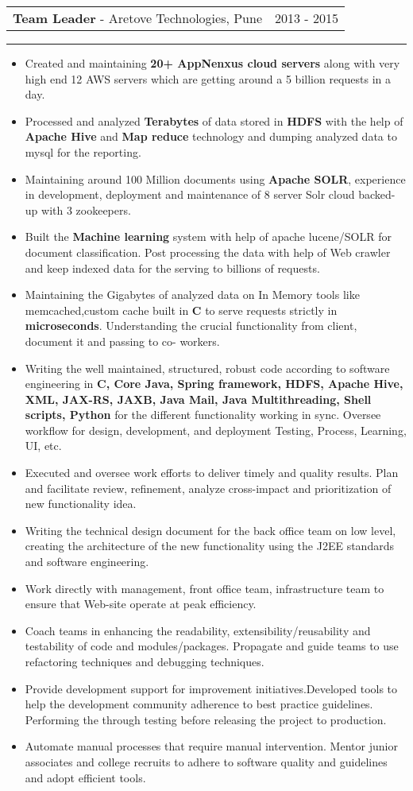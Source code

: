 \documentclass[10pt,A4]{article}
\newcommand{\cvevent}[4]
{

\begin{tabular*}{1\textwidth}{p{13.6cm}  x{3.9cm}}
	\textbf{#2} - \textcolor{bgcol}{#3} &   \vspace{2.0pt}\textcolor{sectcol}{#1}
\end{tabular*}

\vspace{-8pt}
\textcolor{softcol}{\hrule}
\vspace{6pt}

  #4 

}
\begin{document}
\cvevent{2013 - 2015}
{Team Leader}
{Aretove Technologies, Pune}
{
\begin{itemize}

\item Created and maintaining \textbf{20+ AppNenxus cloud servers} along with very high end 12 AWS servers which are getting around a 5 billion requests in a day.

\item Processed and analyzed \textbf{Terabytes} of data stored in \textbf{HDFS} with the help of \textbf{Apache Hive} and \textbf{Map reduce} 
technology and dumping analyzed data to mysql for the reporting.

\item Maintaining around 100 Million documents using \textbf{Apache SOLR}, experience in
development, deployment and maintenance of 8 server Solr cloud backed-up with 3
zookeepers.
\item Built the \textbf{Machine learning} system with help of apache lucene/SOLR for document
classification. Post processing the data with help of Web crawler and keep indexed data for the
serving to billions of requests.
\item Maintaining the Gigabytes of analyzed data on In Memory tools like
memcached,custom cache built in \textbf{C} to serve requests strictly in \textbf{microseconds}.
Understanding the crucial functionality from client, document it and passing to co-
workers.
\item Writing the well maintained, structured, robust code according to software engineering
in \textbf{C, Core Java, Spring framework, HDFS, Apache Hive, XML, JAX-RS, JAXB, Java Mail, Java
Multithreading, Shell scripts, Python} for the different functionality working in sync.
Oversee workflow for design, development, and deployment Testing, Process,
Learning, UI, etc.
\item Executed and oversee work efforts to deliver timely and quality results.
Plan and facilitate review, refinement, analyze cross-impact and prioritization of
new functionality idea.
\item Writing the technical design document for the back office team on low level,
creating the architecture of the new functionality using the J2EE standards and software
engineering.
\item Work directly with management, front office team, infrastructure team to ensure that
Web-site operate at peak efficiency.
\item Coach teams in enhancing the readability, extensibility/reusability and
testability of code and modules/packages. Propagate and guide teams to use refactoring techniques and debugging
techniques.
\item Provide development support for improvement initiatives.Developed tools to help the development community adherence to best practice
guidelines. Performing the through testing before releasing the project to production.
\item Automate manual processes that require manual intervention.
Mentor junior associates and college recruits to adhere to software quality and
guidelines and adopt efficient tools.

\end{itemize}
}
\end{document}
